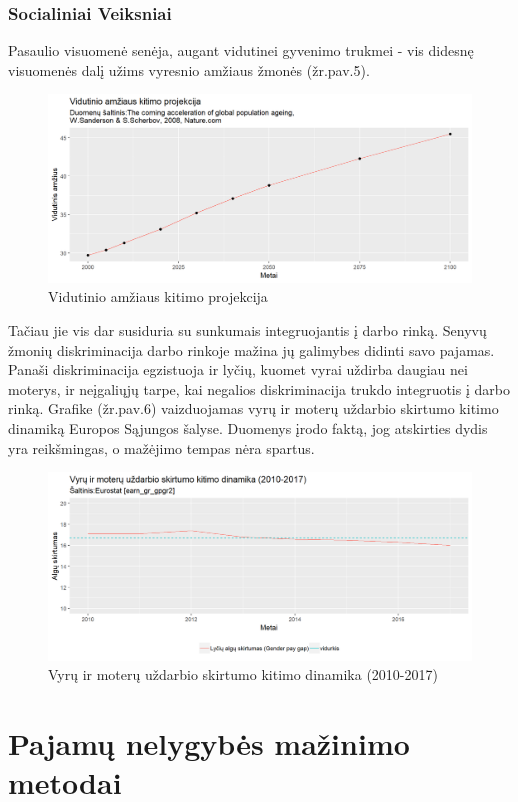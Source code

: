 \documentclass[12pt,a4paper,titlepage]{article}
\begin{document}
\subsubsection{Socialiniai Veiksniai}
Pasaulio visuomenė senėja, augant vidutinei gyvenimo trukmei - vis didesnę visuomenės dalį užims vyresnio amžiaus žmonės (žr.pav.5).
\begin{figure}[H]
\includegraphics[scale=0.7]{amziausprojekcija.png}
\caption{Vidutinio amžiaus kitimo projekcija}
\end{figure}
Tačiau jie vis dar susiduria su sunkumais integruojantis į darbo rinką. Senyvų žmonių diskriminacija darbo rinkoje mažina jų galimybes didinti savo pajamas. Panaši diskriminacija egzistuoja ir lyčių, kuomet vyrai uždirba daugiau nei moterys, ir neįgaliųjų tarpe, kai negalios diskriminacija trukdo integruotis į darbo rinką. Grafike (žr.pav.6) vaizduojamas vyrų ir moterų uždarbio skirtumo kitimo dinamiką Europos Sąjungos šalyse. Duomenys įrodo faktą, jog atskirties dydis yra reikšmingas, o mažėjimo tempas nėra spartus.
\begin{figure}[H]
\includegraphics[scale=0.7]{genderpaygap.png}
\caption{Vyrų ir moterų uždarbio skirtumo kitimo dinamika (2010-2017)}
\end{figure}

\section{Pajamų nelygybės mažinimo metodai}
\end{document}
